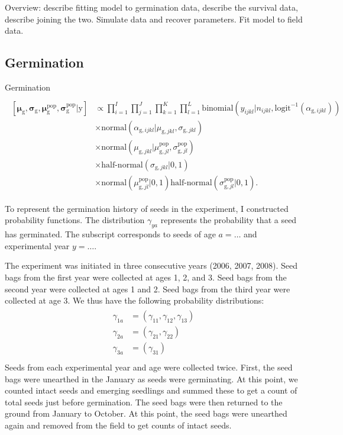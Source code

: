 \documentclass[12pt, oneside, titlepage]{article}   	%
\begin{document}
Overview: describe fitting model to germination data, describe the survival data, describe joining the two. Simulate data and recover parameters. Fit model to field data. 

\subsection{Germination}

Germination 
%
\begin{align}
  \begin{split}
  \\ [ \bm{\mu}_\mathrm{g} , \bm{\sigma}_\mathrm{g} , \bm{\mu}_\mathrm{g}^\mathrm{pop}, \bm{\sigma}_\mathrm{g}^\mathrm{pop} |  \bm{\mathrm{y}}  ] &  \propto \prod_{i=1}^{I} \prod_{j=1}^{J} \prod_{k=1}^{K} \prod_{l=1}^{L} 
   \mathrm{binomial} ( y_{ijkl} | n_{ijkl}, \mathrm{logit}^{-1}(\alpha_{\mathrm{g},ijkl}) ) 
   \\ & \times \mathrm{normal} ( \alpha_{\mathrm{g},ijkl}  | \mu_{\mathrm{g},jkl}, \sigma{_{\mathrm{g},jkl} })
  \\ & \times \mathrm{normal} ( \mu_{\mathrm{g},jkl}  | \mu^\mathrm{pop}_{\mathrm{g},jl}, \sigma^\mathrm{pop}_{\mathrm{g},jl} )
  \\ & \times \textrm{half-normal} ( \sigma_{\mathrm{g},jkl} | 0,1)
  \\ & \times \mathrm{normal} ( \mu^\mathrm{pop}_{\mathrm{g},jl} | 0 , 1 ) \textrm{half-normal} ( \sigma^\mathrm{pop}_{\mathrm{g},jl} | 0,1).
  \end{split}
\end{align}

To represent the germination history of seeds in the experiment, I constructed probability functions. The distribution $\gamma_{ya}$ represents the probability that a seed has germinated. The subscript corresponds to seeds of age $a=\dots$ and experimental year $y=\dots$. 

The experiment was initiated in three consecutive years (2006, 2007, 2008). Seed bags from the first year were collected at ages 1, 2, and 3. Seed bags from the second year were collected at ages 1 and 2. Seed bags from the third year were collected at age 3. We thus have the following probability distributions:
%
\begin{align}
  \begin{split}
\gamma_{1a} & = (\gamma_{11}, \gamma_{12}, \gamma_{13}) \\
\gamma_{2a} & = (\gamma_{21}, \gamma_{22}) \\
\gamma_{3a} & = (\gamma_{31}) \\
  \end{split}
\end{align}
%
Seeds from each experimental year and age were collected twice. First, the seed bags were unearthed in the January as seeds were germinating. At this point, we counted intact seeds and emerging seedlings and summed these to get a count of total seeds just before germination. The seed bags were then returned to the ground from January to October. At this point, the seed bags were unearthed again and removed from the field to get counts of intact seeds. 
\end{document}

